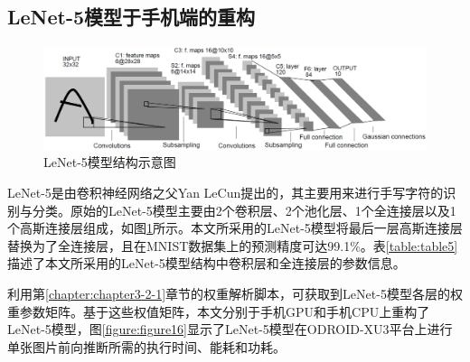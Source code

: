 \subsection{LeNet-5模型于手机端的重构}

\begin{figure}[htbp]
    \centering
    \includegraphics[width=1.0\textwidth]{figures/lenet.pdf}
    \caption{LeNet-5模型结构示意图 \cite{lecun1998gradient}}\label{figure:figure15}
\end{figure}

LeNet-5是由卷积神经网络之父Yan LeCun提出的，其主要用来进行手写字符的识别与分类。原始的LeNet-5模型主要由2个卷积层、2个池化层、1个全连接层以及1个高斯连接层组成，如图\ref{figure:figure15}所示。本文所采用的LeNet-5模型将最后一层高斯连接层替换为了全连接层，且在MNIST数据集\cite{lecun.com}上的预测精度可达99.1\%。表\ref{table:table5}描述了本文所采用的LeNet-5模型结构中卷积层和全连接层的参数信息。

\begin{table}[htbp]
  \centering
  \caption{LeNet-5模型结构中的卷积层和全连接层}
  \label{table:table5}
\end{table}

利用第\ref{chapter:chapter3-2-1}章节的权重解析脚本，可获取到LeNet-5模型各层的权重参数矩阵。基于这些权值矩阵，本文分别于手机GPU和手机CPU上重构了LeNet-5模型，图\ref{figure:figure16}显示了LeNet-5模型在ODROID-XU3平台上进行单张图片前向推断所需的执行时间、能耗和功耗。

